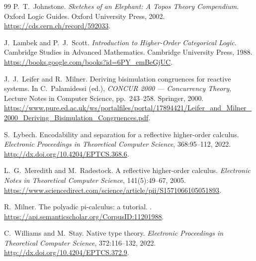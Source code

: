 \documentclass[11pt]{article}
\theoremstyle{definition}
\theoremstyle{plain}
\theoremstyle{remark}
\theoremstyle{plain}
\begin{document}
\begin{thebibliography}{99}
P.~T.~Johnstone.
\newblock \emph{Sketches of an Elephant: A Topos Theory Compendium}.
\newblock Oxford Logic Guides. Oxford University Press, 2002.
\newblock \url{https://cds.cern.ch/record/592033}.

J.~Lambek and P.~J.~Scott.
\newblock \emph{Introduction to Higher-Order Categorical Logic}.
\newblock Cambridge Studies in Advanced Mathematics. Cambridge University Press, 1988.
\newblock \url{https://books.google.com/books?id=6PY_emBeGjUC}.

J.~J.~Leifer and R.~Milner.
\newblock Deriving bisimulation congruences for reactive systems.
\newblock In C.~Palamidessi (ed.), \emph{CONCUR 2000 --- Concurrency Theory},
Lecture Notes in Computer Science, pp.~243--258. Springer, 2000.
\newblock \url{https://www.pure.ed.ac.uk/ws/portalfiles/portal/17894421/Leifer_and_Milner_2000_Deriving_Bisimulation_Congruences.pdf}.

S.~Lybech.
\newblock Encodability and separation for a reflective higher-order calculus.
\newblock \emph{Electronic Proceedings in Theoretical Computer Science}, 368:95--112, 2022.
\newblock \url{http://dx.doi.org/10.4204/EPTCS.368.6}.

L.~G.~Meredith and M.~Radestock.
\newblock A reflective higher-order calculus.
\newblock \emph{Electronic Notes in Theoretical Computer Science}, 141(5):49--67, 2005.
\newblock \url{https://www.sciencedirect.com/science/article/pii/S1571066105051893}.

R.~Milner.
\newblock The polyadic pi-calculus: a tutorial.
.
\newblock \url{https://api.semanticscholar.org/CorpusID:11201988}.

C.~Williams and M.~Stay.
\newblock Native type theory.
\newblock \emph{Electronic Proceedings in Theoretical Computer Science}, 372:116--132, 2022.
\newblock \url{http://dx.doi.org/10.4204/EPTCS.372.9}.

\end{thebibliography}
\end{document}
